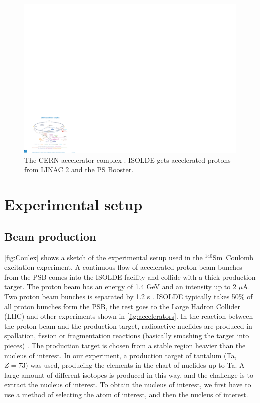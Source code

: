\documentclass[twoside,english]{uiofysmaster/uiofysmaster}
\newcommand{\Sm}{$^{140}$Sm} %
\begin{document}
\begin{figure}[ht]
	\centering
	\includegraphics[width=\textwidth]{Images/0812015.pdf}
	\caption{The CERN accelerator complex \cite{CERN-AC}. ISOLDE gets accelerated protons from LINAC 2 and the PS Booster.}
	\label{fig:accelerators}
\end{figure}


\section{Experimental setup}
\subsection{Beam production}
\autoref{fig:Coulex} shows a sketch of the experimental setup used in the \Sm\ Coulomb excitation experiment. A continuous flow of accelerated proton beam bunches from the PSB comes into the ISOLDE facility and collide with a thick production target. The proton beam has an energy of 1.4 GeV and an intensity up to 2 $\mu$A. Two proton beam bunches is separated by 1.2 s \cite{TIF, TIF2013}. ISOLDE typically takes 50\% \cite{MB-spect} of all proton bunches form the PSB, the rest goes to the Large Hadron Collider (LHC) and other experiments shown in \autoref{fig:accelerators}. In the reaction between the proton beam and the production target, radioactive nuclides are produced in spallation, fission or fragmentation reactions (basically smashing the target into pieces) \cite{ISOLDE-web}. The production target is chosen from a stable region heavier than the nucleus of interest. In our experiment, a production target of tantalum (Ta, $Z = 73$) was used, producing the elements in the chart of nuclides up to Ta. A large amount of different isotopes is produced in this way, and the challenge is to extract the nucleus of interest. To obtain the nucleus of interest, we first have to use a method of selecting the atom of interest, and then the nucleus of interest. 
\end{document}
